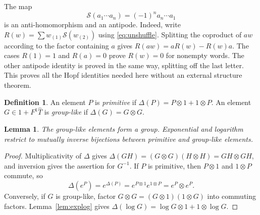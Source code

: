 \documentclass[11pt]{article}
\newtheorem{lemma}[theorem]{Lemma}
\theoremstyle{definition}
\newtheorem{definition}[theorem]{Definition}
\theoremstyle{remark}
\numberwithin{equation}{section}
\begin{document}
The map
\begin{equation}\label{eq:antipode}
 \mathcal S(a_1\cdots a_n)=(-1)^na_n\cdots a_1
\end{equation}
is an anti-homomorphism and an antipode. Indeed, write
$R(w)=\sum w_{(1)}\mathcal S(w_{(2)})$ using \eqref{eq:unshuffle}. Splitting the coproduct of $aw$ according to the factor containing $a$ gives $R(aw)=aR(w)-R(w)a$. The cases $R(1)=1$ and $R(a)=0$ prove $R(w)=0$ for nonempty words. The other antipode identity is proved in the same way, splitting off the last letter. This proves all the Hopf identities needed here without an external structure theorem.

\begin{definition}
An element $P$ is \emph{primitive} if $\Delta(P)=P\otimes1+1\otimes P$. An element $G\in1+F^1\widehat T$ is \emph{group-like} if $\Delta(G)=G\otimes G$.
\end{definition}
\begin{lemma}\label{lem:group-like}
The group-like elements form a group. Exponential and logarithm restrict to mutually inverse bijections between primitive and group-like elements.
\end{lemma}
\begin{proof}
Multiplicativity of $\Delta$ gives
$\Delta(GH)=(G\otimes G)(H\otimes H)=GH\otimes GH$,
and inversion gives the assertion for $G^{-1}$. If $P$ is primitive, then $P\otimes1$ and $1\otimes P$ commute, so
\[
 \Delta(e^P)=e^{\Delta(P)}=e^{P\otimes1}e^{1\otimes P}=e^P\otimes e^P.
\]
Conversely, if $G$ is group-like, factor $G\otimes G=(G\otimes1)(1\otimes G)$ into commuting factors. Lemma~\ref{lem:explog} gives
$\Delta(\log G)=\log G\otimes1+1\otimes\log G$.
\end{proof}
\end{document}

